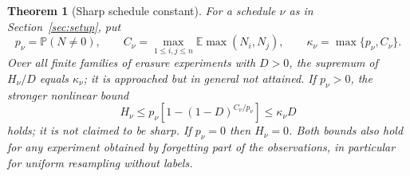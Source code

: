 \documentclass[11pt,a4paper]{article}
\newtheorem{theorem}{Theorem}[section]
\theoremstyle{definition}\newtheorem{definition}[theorem]{Definition}
\theoremstyle{remark}\newtheorem{remark}[theorem]{Remark}
\newcommand{\E}{\mathbb E}
\newcommand{\PP}{\mathbb P}
\begin{document}
\begin{theorem}[Sharp schedule constant]\label{thm:schedule}
For a schedule $\nu$ as in Section~\ref{sec:setup}, put
\begin{equation}\label{eq:K}
p_\nu=\PP(N\ne0),\qquad
C_\nu=\max_{1\le i,j\le n}\E\max(N_i,N_j),\qquad
\kappa_\nu=\max\{p_\nu,C_\nu\}.
\end{equation}
Over all finite families of erasure experiments with $D>0$, the supremum of $H_\nu/D$ equals $\kappa_\nu$; it is approached but in general not attained. If $p_\nu>0$, the stronger nonlinear bound
\begin{equation}\label{eq:jensen}
H_\nu\le p_\nu\left[1-(1-D)^{C_\nu/p_\nu}\right]\le \kappa_\nu D
\end{equation}
holds; it is not claimed to be sharp. If $p_\nu=0$ then $H_\nu=0$. Both bounds also hold for any experiment obtained by forgetting part of the observations, in particular for uniform resampling without labels.
\end{theorem}
\end{document}
